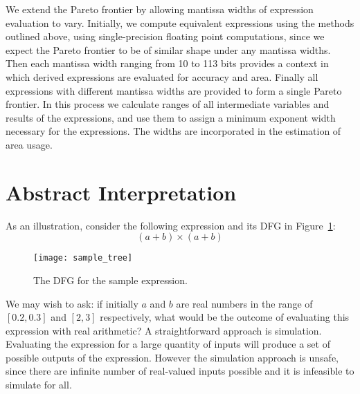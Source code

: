 We extend the Pareto frontier by allowing mantissa widths of expression
evaluation to vary. Initially, we compute equivalent expressions using the
methods outlined above, using single-precision floating point computations,
since we expect the Pareto frontier to be of similar shape under any mantissa
widths. Then each mantissa width ranging from 10 to 113 bits provides a context
in which derived expressions are evaluated for accuracy and area. Finally all
expressions with different mantissa widths are provided to form a single Pareto
frontier. In this process we calculate ranges of all intermediate variables
and results of the expressions, and use them to assign a minimum exponent
width necessary for the expressions. The widths are incorporated in the
estimation of area usage.


\section{Abstract Interpretation}

As an illustration, consider the following expression and its DFG in
Figure~\ref{bg:fig:sample_tree}\@:
\begin{equation}
    (a + b) \times (a + b)
    \label{bg:eq:absint_sample}
\end{equation}
\begin{figure}[ht]
    \centering
    \texttt{[image: sample\_tree]}
    \caption{The DFG for the sample expression.}\label{bg:fig:sample_tree}
\end{figure}

We may wish to ask: if initially $a$ and $b$ are real numbers in the range of
$[0.2, 0.3]$ and $[2, 3]$ respectively, what would be the outcome of evaluating
this expression with real arithmetic? A straightforward approach is simulation.
Evaluating the expression for a large quantity of inputs will produce a set
of possible outputs of the expression. However the simulation approach is
unsafe, since there are infinite number of real-valued inputs possible and it
is infeasible to simulate for all.

